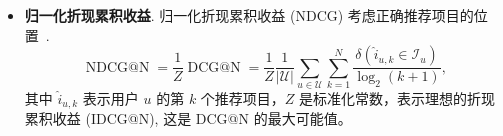 \begin{itemize}
    \item \textbf{归一化折现累积收益}. 归一化折现累积收益 (NDCG) 考虑正确推荐项目的位置~\cite{jarvelin2000ir}.
        \begin{equation}
            \operatorname{NDCG@N} = \frac{1}{Z}\operatorname{DCG@N} = \frac{1}{Z} \frac{1}{|\mathcal{U}|}\sum_{u\in\mathcal{U}}\sum_{k=1}^{N}\frac{\delta(\hat{i}_{u,k}\in \mathcal{I}_{u})}{\operatorname{log}_2(k+1)},
        \end{equation}
        其中 $\hat{i}_{u,k}$ 表示用户 $u$ 的第 $k$ 个推荐项目，$Z$ 是标准化常数，表示理想的折现累积收益 (IDCG@N), 这是 DCG@N 的最大可能值。 
\end{itemize}



